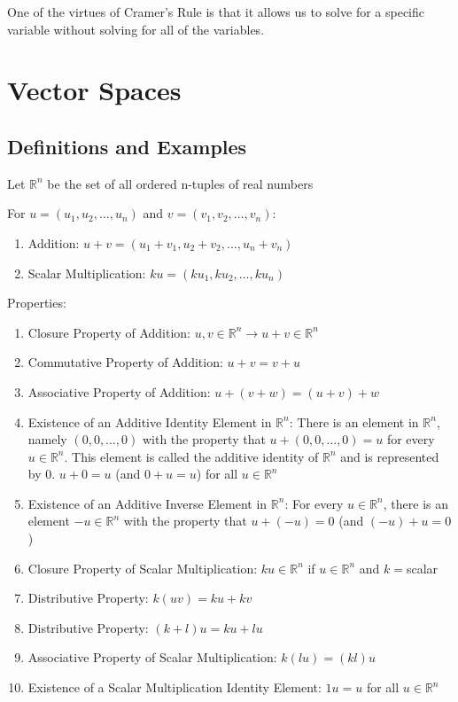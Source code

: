 \documentclass[12pt]{article}
\begin{document}
One of the virtues of Cramer's Rule is that it allows us to solve for a specific variable without solving for all of the variables. 

\section{Vector Spaces} 

\subsection{Definitions and Examples} 
\begin{definition} Let $\mathbb{R}^n$ be the set of all ordered n-tuples of real numbers \end{definition} 
For $ u = (u_1, u_2, \dots, u_n)$ and $ v = (v_1, v_2, \dots, v_n)$: \begin{enumerate} 
\item Addition: $ u + v = (u_1 + v_1, u_2 + v_2, \dots, u_n + v_n) $
\item Scalar Multiplication: $ ku = (ku_1, ku_2, \dots, ku_n) $ \end{enumerate} 
Properties: \begin{enumerate} 
\item Closure Property of Addition: $u, v \in \mathbb{R}^n \rightarrow u + v \in \mathbb{R}^n $
\item Commutative Property of Addition: $u + v = v + u$ 
\item Associative Property of Addition: $u + (v + w) = (u + v) + w $
\item Existence of an Additive Identity Element in $\mathbb{R}^n$: There is an element in $\mathbb{R}^n$, namely $ (0, 0, \dots, 0)$ with the property that $u + (0, 0, \dots, 0) = u$ for every $u \in \mathbb{R}^n$. This element is called the additive identity of $\mathbb{R}^n$ and is represented by $0$. \newline $u + 0 = u$ (and $ 0 + u = u$) for all $ u \in \mathbb{R}^n$ 
\item Existence of an Additive Inverse Element in $\mathbb{R}^n$: For every $u \in \mathbb{R}^n$, there is an element $-u \in \mathbb{R}^n$ with the property that $ u + (-u) = 0$ (and $(-u) + u = 0$) 
\item Closure Property of Scalar Multiplication: $ku \in \mathbb{R}^n$ if $u \in \mathbb{R}^n$ and $k = $scalar 
\item Distributive Property: $k(uv) = ku + kv$
\item Distributive Property: $(k + l)u = ku + lu $
\item Associative Property of Scalar Multiplication: $k(lu) = (kl)u $
\item Existence of a Scalar Multiplication Identity Element: $1u = u$ for all $u \in \mathbb{R}^n$ \end{enumerate} 
\end{document}
